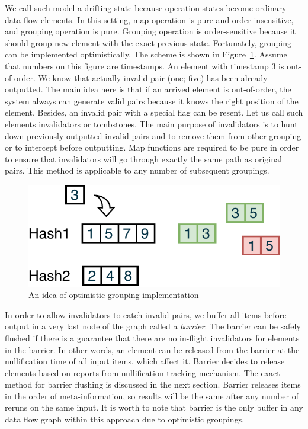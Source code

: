 We call such model a drifting state because operation states become ordinary data flow elements. In this setting, map operation is pure and order insensitive, and grouping operation is pure. Grouping operation is order-sensitive because it should group new element with the exact previous state. Fortunately, grouping can be implemented optimistically. The scheme is shown in Figure~\ref{optimistic-grouping}. Assume that numbers on this figure are timestamps. An element with timestamp 3 is out-of-order. We know that actually invalid pair (one; five) has been already outputted. The main idea here is that if an arrived element is out-of-order, the system always can generate valid pairs because it knows the right position of the element. Besides, an invalid pair with a special flag can be resent. Let us call such elements invalidators or tombstones. The main purpose of invalidators is to hunt down previously outputted invalid pairs and to remove them from other grouping or to intercept before outputting. Map functions are required to be pure in order to ensure that invalidators will go through exactly the same path as original pairs. This method is applicable to any number of subsequent groupings.
 
\begin{figure}[htbp]
  \centering
  \includegraphics[width=.35\textwidth]{pics/grouping-invalidation}
  \caption{An idea of optimistic grouping implementation}
  \label {optimistic-grouping}
\end{figure} 
 
In order to allow invalidators to catch invalid pairs, we buffer all items before output in a very last node of the graph called a {\em barrier}. The barrier can be safely flushed if there is a guarantee that there are no in-flight invalidators for elements in the barrier. In other words, an element can be released from the barrier at the nullification time of all input items, which affect it. Barrier decides to release elements based on reports from nullification tracking mechanism. The exact method for barrier flushing is discussed in the next section. Barrier releases items in the order of meta-information, so results will be the same after any number of reruns on the same input. It is worth to note that barrier is the only buffer in any data flow graph within this approach due to optimistic groupings. 


